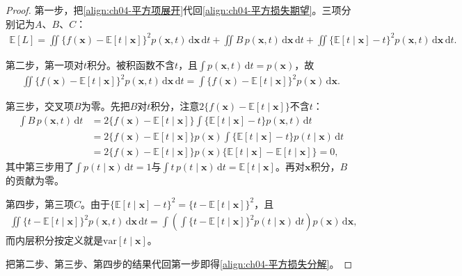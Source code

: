 \documentclass[../../main.tex]{subfiles}
\begin{document}
\begin{proof}
第一步，把\eqref{align:ch04-平方项展开}代回\eqref{align:ch04-平方损失期望}。三项分别记为$A$、$B$、$C$：
\begin{align*}
  \mathbb{E}[L]=\iint\{f(\boldsymbol{x})-\mathbb{E}[t\mid\boldsymbol{x}]\}^2p(\boldsymbol{x},t)\,\mathrm{d}\boldsymbol{x}\,\mathrm{d}t
  +\iint B\,p(\boldsymbol{x},t)\,\mathrm{d}\boldsymbol{x}\,\mathrm{d}t
  +\iint\{\mathbb{E}[t\mid\boldsymbol{x}]-t\}^2p(\boldsymbol{x},t)\,\mathrm{d}\boldsymbol{x}\,\mathrm{d}t.
\end{align*}

第二步，第一项对$t$积分。被积函数不含$t$，且$\int p(\boldsymbol{x},t)\,\mathrm{d}t=p(\boldsymbol{x})$，故
\begin{align*}
  \iint\{f(\boldsymbol{x})-\mathbb{E}[t\mid\boldsymbol{x}]\}^2p(\boldsymbol{x},t)\,\mathrm{d}\boldsymbol{x}\,\mathrm{d}t
  =\int\{f(\boldsymbol{x})-\mathbb{E}[t\mid\boldsymbol{x}]\}^2p(\boldsymbol{x})\,\mathrm{d}\boldsymbol{x}.
\end{align*}

第三步，交叉项$B$为零。先把$B$对$t$积分，注意$2\{f(\boldsymbol{x})-\mathbb{E}[t\mid\boldsymbol{x}]\}$不含$t$：
\begin{align*}
  \int B\,p(\boldsymbol{x},t)\,\mathrm{d}t
  &=2\{f(\boldsymbol{x})-\mathbb{E}[t\mid\boldsymbol{x}]\}\int\{\mathbb{E}[t\mid\boldsymbol{x}]-t\}p(\boldsymbol{x},t)\,\mathrm{d}t\\
  &=2\{f(\boldsymbol{x})-\mathbb{E}[t\mid\boldsymbol{x}]\}p(\boldsymbol{x})\int\{\mathbb{E}[t\mid\boldsymbol{x}]-t\}p(t\mid\boldsymbol{x})\,\mathrm{d}t\\
  &=2\{f(\boldsymbol{x})-\mathbb{E}[t\mid\boldsymbol{x}]\}p(\boldsymbol{x})\bigl\{\mathbb{E}[t\mid\boldsymbol{x}]-\mathbb{E}[t\mid\boldsymbol{x}]\bigr\}=0,
\end{align*}
其中第三步用了$\int p(t\mid\boldsymbol{x})\,\mathrm{d}t=1$与$\int t\,p(t\mid\boldsymbol{x})\,\mathrm{d}t=\mathbb{E}[t\mid\boldsymbol{x}]$。再对$\boldsymbol{x}$积分，$B$的贡献为零。

第四步，第三项$C$。由于$\{\mathbb{E}[t\mid\boldsymbol{x}]-t\}^2=\{t-\mathbb{E}[t\mid\boldsymbol{x}]\}^2$，且
\begin{align*}
  \iint\{t-\mathbb{E}[t\mid\boldsymbol{x}]\}^2p(\boldsymbol{x},t)\,\mathrm{d}\boldsymbol{x}\,\mathrm{d}t
  =\int\left(\int\{t-\mathbb{E}[t\mid\boldsymbol{x}]\}^2p(t\mid\boldsymbol{x})\,\mathrm{d}t\right)p(\boldsymbol{x})\,\mathrm{d}\boldsymbol{x},
\end{align*}
而内层积分按定义就是$\mathrm{var}[t\mid\boldsymbol{x}]$。

把第二步、第三步、第四步的结果代回第一步即得\eqref{align:ch04-平方损失分解}。
\end{proof}
\end{document}
